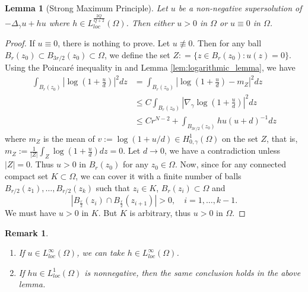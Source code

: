 \documentclass[11pt]{article}
\newtheorem{lemma}{Lemma}[section] %
\newtheorem*{remark}{Remark}
\newcommand{\om} {\Omega}
\newcommand{\Gr}{\Delta_{\gamma}}
\newcommand{\gradgr}{\nabla_{\gamma}}
\newcommand{\spacegr}{H^{1}_{0,\gamma}(\Omega)}
\begin{document}
\begin{lemma}[Strong Maximum Principle]\label{lem:SMP_grushin}
Let $u$ be a non-negative supersolution of $- \Gr u + h u  $ where $h \in L_{loc}^{\frac{2Q}{Q+2}}(\om)$. Then either $u > 0$ in $\om$ or $u \equiv 0$ in $\om$.  
\end{lemma}
\begin{proof}
If $u \equiv 0$, there is nothing to prove. Let $u \not \equiv 0$. Then for any ball $B_r(z_0) \subset B_{3r/2}(z_0) \subset \om $, we define the set $Z : = \{ z \in B_r(z_0): u(z) = 0 \}$. Using the Poincar\'{e} inequality in \cite[Theorem 13.27]{giovanni_fractional} and Lemma \ref{lem:logarithmic_lemma}, we have
\begin{equation*}
\begin{aligned}
 \int_{ B_{r}\left(z_0\right)}\left|\log \left(1+\frac{u}{d}\right)\right|^2 d z & =\int_{ B_{r}\left(z_0\right)}\left|\log \left(1+\frac{u}{d}\right)-m_Z\right|^2 d z \\
 & \leq C \int_{ B_{r}\left(z_0\right)}\left|\gradgr \log \left(1+\frac{u}{d}\right)\right|^2 d z \\
 & \leq C r^{N-2} +\int_{B_{3r/2}(z_0)} h u (u +d )^{-1} dz
\end{aligned}
\end{equation*}
where $m_Z$ is the mean of $v:=\log (1+u / d) \in \spacegr$ on the set $Z$, that is, $m_Z:=\frac{1}{|Z|} \int_Z \log \left(1+\frac{u}{d}\right) d z=0.$ Let $d \to 0$, we have a contradiction unless $|Z| = 0$. Thus $u > 0$ in $B_r(z_0)$ for any $z_0 \in \om$. 
Now, since for any connected compact set $K \subset \om$, we can cover it with a finite number of balls $B_{r / 2}\left(z_1\right), \ldots, B_{r / 2}\left(z_k\right)$ such that $z_i \in K$, $B_r(z_i) \subset \om$ and
\begin{equation*}
\left|B_{\frac{r}{2}}\left(z_i\right) \cap B_{\frac{r}{2}}\left(z_{i+1}\right)\right|>0, \quad i=1, \ldots, k-1 .
\end{equation*}
We must have $u > 0$ in $K$. But $K$ is arbitrary, thus $u > 0$ in $\om$.
\end{proof}

\begin{remark}
\begin{enumerate}
    \item[$(i)$] If $u \in L_{loc}^{\infty}(\om)$, we can take $h \in L_{loc}^{\infty}(\om)$.
    \item[$(ii)$] If $h u \in L_{loc}^1(\om)$ is nonnegative, then the same conclusion holds in the above lemma. 
\end{enumerate}
\end{remark}
\end{document}

